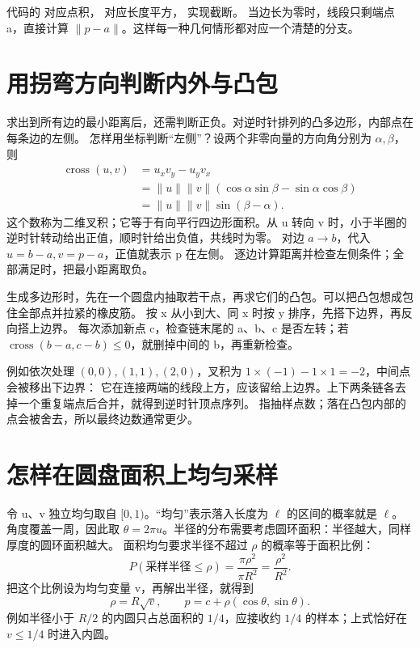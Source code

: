 \par\noindent\begin{minipage}{\linewidth}

\end{minipage}\par
代码的  对应点积， 对应长度平方， 实现截断。
当边长为零时，线段只剩端点 a，直接计算 $\|p-a\|$。这样每一种几何情形都对应一个清楚的分支。

\section{用拐弯方向判断内外与凸包}
求出到所有边的最小距离后，还需判断正负。对逆时针排列的凸多边形，内部点在每条边的左侧。
怎样用坐标判断“左侧”？设两个非零向量的方向角分别为 $\alpha,\beta$，则
\begin{align}
\operatorname{cross}(u,v)&=u_xv_y-u_yv_x\\
 &=\|u\|\|v\|(\cos\alpha\sin\beta-\sin\alpha\cos\beta)\\
 &=\|u\|\|v\|\sin(\beta-\alpha).
\end{align}
这个数称为二维叉积；它等于有向平行四边形面积。从 u 转向 v 时，小于半圈的逆时针转动给出正值，顺时针给出负值，共线时为零。
对边 $a\to b$，代入 $u=b-a,v=p-a$，正值就表示 p 在左侧。
 逐边计算距离并检查左侧条件；全部满足时，把最小距离取负。

生成多边形时，先在一个圆盘内抽取若干点，再求它们的凸包。可以把凸包想成包住全部点并拉紧的橡皮筋。
 按 x 从小到大、同 x 时按 y 排序，先搭下边界，再反向搭上边界。
每次添加新点 c，检查链末尾的 a、b、c 是否左转；若
$\operatorname{cross}(b-a,c-b)\leq0$，就删掉中间的 b，再重新检查。

例如依次处理 $(0,0),(1,1),(2,0)$，叉积为 $1\times(-1)-1\times1=-2$，中间点会被移出下边界：
它在连接两端的线段上方，应该留给上边界。上下两条链各去掉一个重复端点后合并，就得到逆时针顶点序列。
 指抽样点数；落在凸包内部的点会被舍去，所以最终边数通常更少。

\section{怎样在圆盘面积上均匀采样}
令 u、v 独立均匀取自 $[0,1)$。“均匀”表示落入长度为 $\ell$ 的区间的概率就是 $\ell$。
角度覆盖一周，因此取 $\theta=2\pi u$。半径的分布需要考虑圆环面积：半径越大，同样厚度的圆环面积越大。
面积均匀要求半径不超过 $\rho$ 的概率等于面积比例：
\begin{equation}
P(\text{采样半径}\leq\rho)=\frac{\pi\rho^2}{\pi R^2}=\frac{\rho^2}{R^2}.
\end{equation}
把这个比例设为均匀变量 v，再解出半径，就得到
\begin{equation}
\rho=R\sqrt v,\qquad p=c+\rho(\cos\theta,\sin\theta).
\end{equation}
例如半径小于 $R/2$ 的内圆只占总面积的 $1/4$，应接收约 $1/4$ 的样本；上式恰好在 $v\leq1/4$ 时进入内圆。

